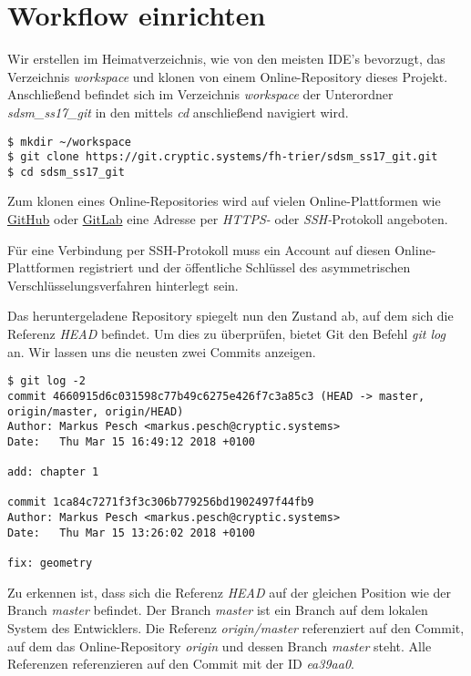 \section{Workflow einrichten}
Wir erstellen im Heimatverzeichnis, wie von den meisten IDE's bevorzugt, das Verzeichnis \textit{workspace} und klonen von einem Online-Repository dieses Projekt. Anschließend befindet sich im Verzeichnis \textit{workspace} der Unterordner \textit{sdsm\_ss17\_git} in den mittels \textit{cd} anschließend navigiert wird.

\begin{verbatim}
$ mkdir ~/workspace
$ git clone https://git.cryptic.systems/fh-trier/sdsm_ss17_git.git
$ cd sdsm_ss17_git
\end{verbatim}

\begin{INFO}
  Zum klonen eines Online-Repositories wird auf vielen Online-Plattformen wie \href{https://github.com}{GitHub} oder \href{https://gitlab.com}{GitLab} eine Adresse per \textit{HTTPS-} oder \textit{SSH-}Protokoll angeboten. 
  
  Für eine Verbindung per SSH-Protokoll muss ein Account auf diesen Online-Plattformen registriert und der öffentliche Schlüssel des asymmetrischen Verschlüsselungsverfahren hinterlegt sein.  
\end{INFO}

Das heruntergeladene Repository spiegelt nun den Zustand ab, auf dem sich die Referenz \textit{HEAD} befindet. Um dies zu überprüfen, bietet Git den Befehl \textit{git log} an. Wir lassen uns die neusten zwei Commits anzeigen.

\begin{verbatim}
$ git log -2
commit 4660915d6c031598c77b49c6275e426f7c3a85c3 (HEAD -> master, 
origin/master, origin/HEAD)
Author: Markus Pesch <markus.pesch@cryptic.systems>
Date:   Thu Mar 15 16:49:12 2018 +0100

add: chapter 1

commit 1ca84c7271f3f3c306b779256bd1902497f44fb9
Author: Markus Pesch <markus.pesch@cryptic.systems>
Date:   Thu Mar 15 13:26:02 2018 +0100

fix: geometry
\end{verbatim}

Zu erkennen ist, dass sich die Referenz \textit{HEAD} auf der gleichen Position wie der Branch \textit{master} befindet. Der Branch \textit{master} ist ein Branch auf dem lokalen System des Entwicklers. Die Referenz \textit{origin/master} referenziert auf den Commit, auf dem das Online-Repository \textit{origin} und dessen Branch \textit{master} steht. Alle Referenzen referenzieren auf den Commit mit der ID \textit{ea39aa0}.

